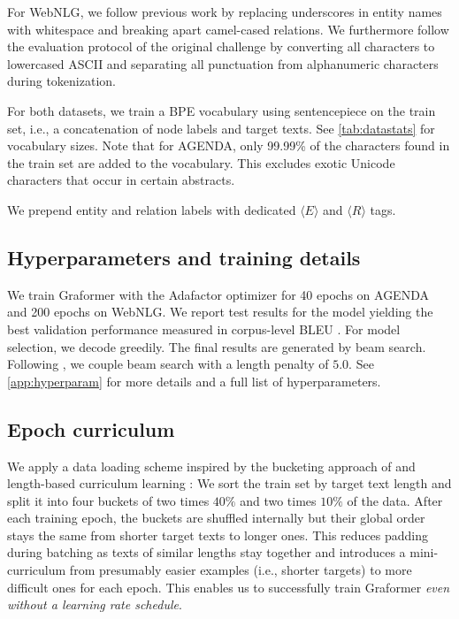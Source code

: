 \documentclass[11pt]{article}
\begin{document}
For {WebNLG},
we follow previous work \citep{gardent-etal-2017-webnlg}
by replacing underscores in entity names with whitespace
and breaking apart camel-cased relations.
We furthermore follow the evaluation protocol of the original challenge
by converting all characters to lowercased ASCII and
separating all punctuation from alphanumeric characters during tokenization.

For both datasets,
we train a BPE vocabulary using sentencepiece \citep{kudo-richardson-2018-sentencepiece}
on the
train set,
i.e., a concatenation of node labels and target texts.
See \cref{tab:datastats} for vocabulary sizes.
Note that for AGENDA,
only 99.99\%{} of the characters found in the train set
are added to the vocabulary.
This excludes exotic Unicode characters that occur in certain abstracts.

We prepend entity and relation labels with dedicated $\langle E\rangle$ and $\langle R\rangle$ tags.

\subsection{Hyperparameters and training details}
We train Graformer with the Adafactor optimizer \citep{adafactor}
for 40 epochs on AGENDA and 200 epochs on WebNLG.
We report test results for the model yielding the best validation performance measured in corpus-level BLEU \citep{papineni-etal-2002-bleu}.
For model selection,
we decode greedily.
The final results are generated by beam search.
Following \citet{ribeiro20},
we couple beam search with a length penalty \citep{wu16} of $5.0$.
See \cref{app:hyperparam} for more details and a full list of hyperparameters.


\subsection{Epoch curriculum}
We apply a data loading scheme inspired by the bucketing approach of \citet{koncel-kedziorski-etal-2019-text}
and length-based curriculum learning \citep{platanios-etal-2019-competence}:
We sort the train set by target text length and split it into four buckets of two times $40\%$ and two times $10\%$ of the data.
After each training epoch, the buckets are shuffled internally
but their global order stays the same from shorter target texts to longer ones.
This reduces padding during batching as texts of similar lengths stay together
and introduces a mini-curriculum from presumably easier examples (i.e., shorter targets) to more difficult ones
for each epoch.
This enables us to successfully train Graformer \textit{even without a learning rate schedule}.
\end{document}
